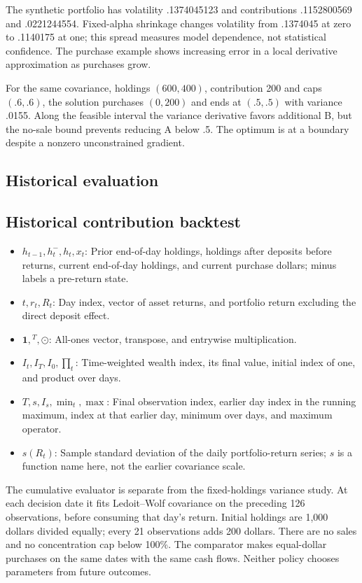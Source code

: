 \documentclass[
  american,
  11pt,
]{article}
\begin{document}
The synthetic portfolio has volatility .1374045123 and contributions
.1152800569 and .0221244554. Fixed-alpha shrinkage changes volatility
from .1374045 at zero to .1140175 at one; this spread measures model
dependence, not statistical confidence. The purchase example shows
increasing error in a local derivative approximation as purchases grow.

For the same covariance, holdings \((600,400)\), contribution 200 and
caps \((.6,.6)\), the solution purchases \((0,200)\) and ends at
\((.5,.5)\) with variance .0155. Along the feasible interval the
variance derivative favors additional B, but the no-sale bound prevents
reducing A below .5. The optimum is at a boundary despite a nonzero
unconstrained gradient.

\subsection{Historical evaluation}\label{remaining-empirical-work}
\subsection*{Historical contribution backtest}
\begin{itemize}
\item \(h_{t-1},h_t^-,h_t,x_t\): Prior end-of-day holdings, holdings after deposits before returns, current end-of-day holdings, and current purchase dollars; minus labels a pre-return state.
\item \(t,r_t,R_t\): Day index, vector of asset returns, and portfolio return excluding the direct deposit effect.
\item \(\mathbf1,{}^T,\odot\): All-ones vector, transpose, and entrywise multiplication.
\item \(I_t,I_T,I_0,\prod_t\): Time-weighted wealth index, its final value, initial index of one, and product over days.
\item \(T,s,I_s,\min_t,\max\): Final observation index, earlier day index in the running maximum, index at that earlier day, minimum over days, and maximum operator.
\item \(s(R_t)\): Sample standard deviation of the daily portfolio-return series; $s$ is a function name here, not the earlier covariance scale.
\end{itemize}

The cumulative evaluator is separate from the fixed-holdings variance study.
At each decision date it fits Ledoit--Wolf covariance on the preceding 126
observations, before consuming that day's return. Initial holdings are 1,000
dollars divided equally; every 21 observations adds 200 dollars. There are
no sales and no concentration cap below 100\%. The comparator makes equal-dollar
purchases on the same dates with the same cash flows. Neither policy chooses
parameters from future outcomes.
\end{document}

